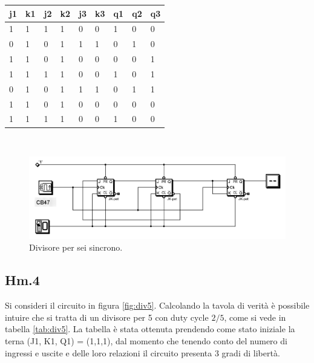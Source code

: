 \documentclass[journal, a4paper]{IEEEtran}
\begin{document}
\begin{table}
\centering

\begin{tabular}{l|l|l|l|l|l|l|l|l}
\hline
\textbf{j1} & \textbf{k1} & \textbf{j2} & \textbf{k2} & \textbf{j3} & \textbf{k3} & \textbf{q1} & \textbf{q2} & \textbf{q3} \\
\hline
1 & 1 & 1 & 1 & 0 & 0 & 1 & 0 & 0 \\

0 & 1 & 0 & 1 & 1 & 1 & 0 & 1 & 0 \\

1 & 1 & 0 & 1 & 0 & 0 & 0 & 0 & 1 \\

1 & 1 & 1 & 1 & 0 & 0 & 1 & 0 & 1 \\

0 & 1 & 0 & 1 & 1 & 1 & 0 & 1 & 1 \\

1 & 1 & 0 & 1 & 0 & 0 & 0 & 0 & 0 \\

1 & 1 & 1 & 1 & 0 & 0 & 1 & 0 & 0 \\
\hline
\end{tabular}

\end{table}
~\\

\begin{figure}
\centering
\includegraphics[width=0.9\linewidth]{./Fig_prov_div6_sincrono}
\caption{Divisore per sei sincrono.}
\label{fig:Fig_prov_div6_sincrono}
\end{figure}


\subsection{Hm.4}
Si consideri il circuito in figura \ref{fig:div5}. Calcolando la tavola di verità è possibile intuire che si tratta di un divisore per 5 con duty cycle $2/5$, come si vede in tabella \ref{tab:div5}. La tabella è stata ottenuta prendendo come stato iniziale la terna (J1, K1, Q1) = (1,1,1), dal momento che tenendo conto del numero di ingressi e uscite e delle loro relazioni il circuito presenta 3 gradi di libertà.
\end{document}
